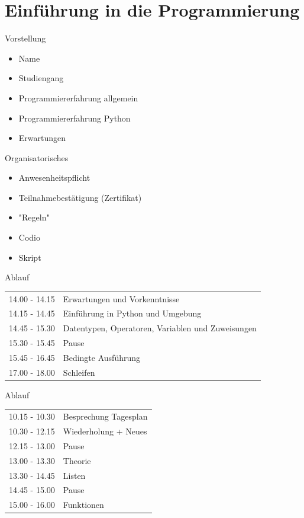 \section{Einführung in die Programmierung}

\begin{frame}{Vorstellung}
\begin{itemize}
	\item Name
	\item Studiengang 
	\item Programmiererfahrung allgemein
	\item Programmiererfahrung Python
	\item Erwartungen
\end{itemize}
\end{frame}

\begin{frame}{Organisatorisches}
    \begin{itemize}
        \item Anwesenheitspflicht
        \item Teilnahmebestätigung (Zertifikat)
        \item "Regeln"
        \item Codio
        \item Skript
    \end{itemize}
\end{frame}

\begin{frame}{Ablauf}
\begin{tabular}{ l l }
	14.00 - 14.15 & Erwartungen und Vorkenntnisse\\
	14.15 - 14.45 & Einführung in Python und Umgebung \\
	14.45 - 15.30 & Datentypen, Operatoren, Variablen und Zuweisungen\\
	15.30 - 15.45 & Pause \\
	15.45 - 16.45 & Bedingte Ausführung \\
	17.00 - 18.00 & Schleifen \\
	
\end{tabular}
\end{frame}

\begin{frame}{Ablauf}

\begin{tabular}{ l l }
10.15 - 10.30 & Besprechung Tagesplan\\
10.30 - 12.15 & Wiederholung + Neues \\
12.15 - 13.00 & Pause \\
13.00 - 13.30 & Theorie\\
13.30 - 14.45 & Listen\\
14.45 - 15.00 & Pause\\
15.00 - 16.00 & Funktionen\\

\end{tabular}
\end{frame}

